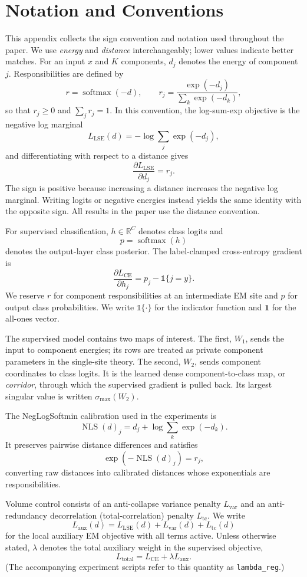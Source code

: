 \section{Notation and Conventions}
\label{sec:notation}
This appendix collects the sign convention and notation used throughout the
paper. We use
\emph{energy} and \emph{distance} interchangeably; lower values indicate better
matches. For an input $x$ and $K$ components, $d_j$ denotes the energy of
component $j$. Responsibilities are defined by
\[
    r = \operatorname{softmax}(-d),
    \qquad
    r_j = \frac{\exp(-d_j)}{\sum_k \exp(-d_k)},
\]
so that $r_j \ge 0$ and $\sum_j r_j = 1$. In this convention, the log-sum-exp
objective is the negative log marginal
\[
    L_{\mathrm{LSE}}(d) = -\log \sum_j \exp(-d_j),
\]
and differentiating with respect to a distance gives
\[
    \frac{\partial L_{\mathrm{LSE}}}{\partial d_j} = r_j.
\]
The sign is positive because increasing a distance increases the negative log
marginal. Writing logits or negative energies instead yields the same identity
with the opposite sign. All results in the paper use the distance convention.

For supervised classification, $h \in \mathbb{R}^C$ denotes class logits and
\[
    p = \operatorname{softmax}(h)
\]
denotes the output-layer class posterior. The label-clamped cross-entropy
gradient is
\[
    \frac{\partial L_{\mathrm{CE}}}{\partial h_j}
    = p_j - \mathbb{1}\{j=y\}.
\]
We reserve $r$ for component responsibilities at an intermediate EM site and
$p$ for output class probabilities. We write $\mathbb{1}\{\cdot\}$ for the
indicator function and $\mathbf{1}$ for the all-ones vector.

The supervised model contains two maps of interest. The first, $W_1$, sends
the input to component energies; its rows are treated as private component
parameters in the single-site theory. The second, $W_2$, sends component
coordinates to class logits. It is the learned dense component-to-class map,
or \emph{corridor}, through which the supervised gradient is pulled back. Its
largest singular value is written $\sigma_{\max}(W_2)$.

The NegLogSoftmin calibration used in the experiments is
\[
    \operatorname{NLS}(d)_j
    = d_j + \log \sum_k \exp(-d_k).
\]
It preserves pairwise distance differences and satisfies
\[
    \exp(-\operatorname{NLS}(d)_j) = r_j,
\]
converting raw distances into calibrated distances whose exponentials are
responsibilities.

Volume control consists of an anti-collapse variance penalty
$L_{\mathrm{var}}$ and an anti-redundancy decorrelation (total-correlation)
penalty $L_{\mathrm{tc}}$. We write
\[
    L_{\mathrm{aux}}(d)
    = L_{\mathrm{LSE}}(d) + L_{\mathrm{var}}(d) + L_{\mathrm{tc}}(d)
\]
for the local auxiliary EM objective with all terms active. Unless otherwise
stated, $\lambda$ denotes the total auxiliary weight in the supervised
objective,
\[
    L_{\mathrm{total}} = L_{\mathrm{CE}} + \lambda L_{\mathrm{aux}}.
\]
(The accompanying experiment scripts refer to this quantity as
\texttt{lambda\_reg}.)

